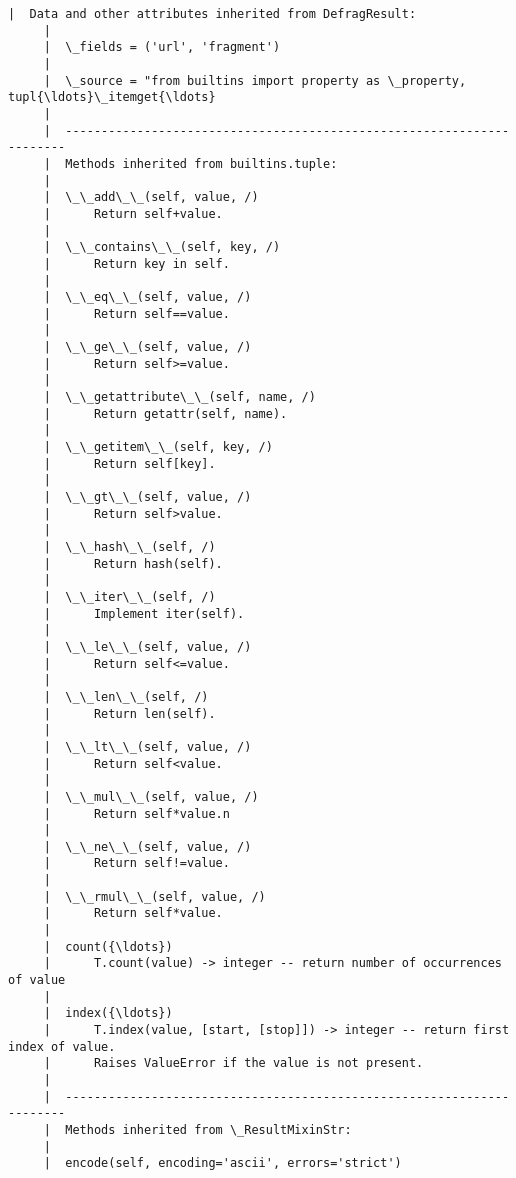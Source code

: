\documentclass[11pt]{article}
\begin{document}
\begin{Verbatim}[commandchars=\\\{\}]
     |  Data and other attributes inherited from DefragResult:
     |  
     |  \_fields = ('url', 'fragment')
     |  
     |  \_source = "from builtins import property as \_property, tupl{\ldots}\_itemget{\ldots}
     |  
     |  ----------------------------------------------------------------------
     |  Methods inherited from builtins.tuple:
     |  
     |  \_\_add\_\_(self, value, /)
     |      Return self+value.
     |  
     |  \_\_contains\_\_(self, key, /)
     |      Return key in self.
     |  
     |  \_\_eq\_\_(self, value, /)
     |      Return self==value.
     |  
     |  \_\_ge\_\_(self, value, /)
     |      Return self>=value.
     |  
     |  \_\_getattribute\_\_(self, name, /)
     |      Return getattr(self, name).
     |  
     |  \_\_getitem\_\_(self, key, /)
     |      Return self[key].
     |  
     |  \_\_gt\_\_(self, value, /)
     |      Return self>value.
     |  
     |  \_\_hash\_\_(self, /)
     |      Return hash(self).
     |  
     |  \_\_iter\_\_(self, /)
     |      Implement iter(self).
     |  
     |  \_\_le\_\_(self, value, /)
     |      Return self<=value.
     |  
     |  \_\_len\_\_(self, /)
     |      Return len(self).
     |  
     |  \_\_lt\_\_(self, value, /)
     |      Return self<value.
     |  
     |  \_\_mul\_\_(self, value, /)
     |      Return self*value.n
     |  
     |  \_\_ne\_\_(self, value, /)
     |      Return self!=value.
     |  
     |  \_\_rmul\_\_(self, value, /)
     |      Return self*value.
     |  
     |  count({\ldots})
     |      T.count(value) -> integer -- return number of occurrences of value
     |  
     |  index({\ldots})
     |      T.index(value, [start, [stop]]) -> integer -- return first index of value.
     |      Raises ValueError if the value is not present.
     |  
     |  ----------------------------------------------------------------------
     |  Methods inherited from \_ResultMixinStr:
     |  
     |  encode(self, encoding='ascii', errors='strict')
    

\end{Verbatim}
\end{document}

